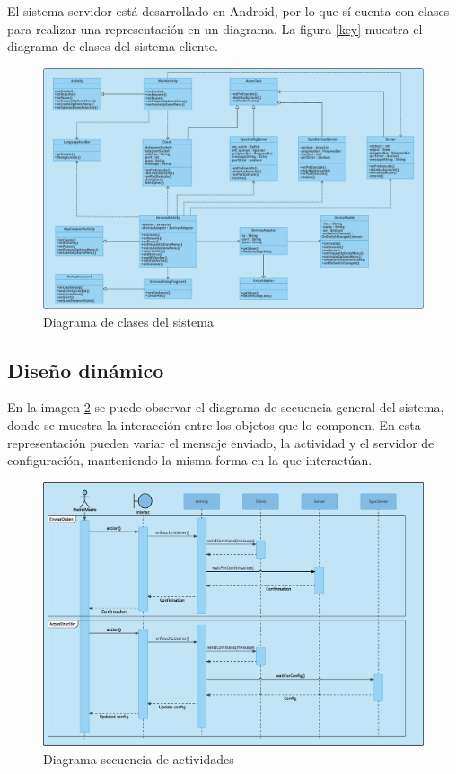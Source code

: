 \documentclass[12pt]{article}
\begin{document}
        El sistema servidor está desarrollado en Android, por lo que sí cuenta con clases para realizar una representación en un diagrama. La figura \ref{key} muestra el diagrama de clases del sistema cliente.
        
        \begin{figure}[h!]
        \centering
            \includegraphics[scale=0.2]{class_diagram.eps}
            \caption{Diagrama de clases del sistema}
            \label{fig:class_diagram}
        \end{figure}

    \subsection{Diseño dinámico}
    En la imagen \ref{fig:main_activity_sequence_diagram} se puede observar el diagrama de secuencia general del sistema, donde se muestra la interacción entre los objetos que lo componen. En esta representación pueden variar el mensaje enviado, la actividad y el servidor de configuración, manteniendo la misma forma en la que interactúan.

    \begin{figure}[h!]
    \centering
        \includegraphics[scale=0.32]{main_activity_sequence_diagram.eps}
        \caption{Diagrama secuencia de actividades}
        \label{fig:main_activity_sequence_diagram}
    \end{figure}
\end{document}

